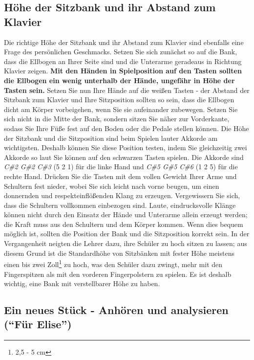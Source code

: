 \subsection{Höhe der Sitzbank und ihr Abstand zum Klavier}
\label{c1ii3}

Die richtige Höhe der Sitzbank und ihr Abstand zum Klavier sind ebenfalls eine Frage des persönlichen Geschmacks.
Setzen Sie sich zunächst so auf die Bank, dass die Ellbogen an Ihrer Seite sind und die Unterarme geradeaus in Richtung Klavier zeigen.
\textbf{Mit den Händen in Spielposition auf den Tasten sollten die Ellbogen ein wenig unterhalb der Hände, ungefähr in Höhe der Tasten sein.}
Setzen Sie nun Ihre Hände auf die weißen Tasten - der Abstand der Sitzbank zum Klavier und Ihre Sitzposition sollten so sein, dass die Ellbogen dicht am Körper vorbeigehen, wenn Sie sie aufeinander zubewegen.
Setzen Sie sich nicht in die Mitte der Bank, sondern sitzen Sie näher zur Vorderkante, sodass Sie Ihre Füße fest auf den Boden oder die Pedale stellen können.
Die Höhe der Sitzbank und die Sitzposition sind beim Spielen lauter Akkorde am wichtigsten.
Deshalb können Sie diese Position testen, indem Sie gleichzeitig zwei Akkorde so laut Sie können auf den schwarzen Tasten spielen.
Die Akkorde sind \textit{C\#2 G\#2 C\#3} (5 2 1) für die linke Hand und \textit{C\#5 G\#5 C\#6} (1 2 5) für die rechte Hand.
Drücken Sie die Tasten mit dem vollen Gewicht Ihrer Arme und Schultern fest nieder, wobei Sie sich leicht nach vorne beugen, um einen donnernden und respekteinflößenden Klang zu erzeugen.
Vergewissern Sie sich, dass die Schultern vollkommen einbezogen sind.
Laute, eindrucksvolle Klänge können nicht durch den Einsatz der Hände und Unterarme allein erzeugt werden; die Kraft muss aus den Schultern und dem Körper kommen.
Wenn dies bequem möglich ist, sollten die Position der Bank und die Sitzposition korrekt sein.
In der Vergangenheit neigten die Lehrer dazu, ihre Schüler zu hoch sitzen zu lassen;
aus diesem Grund ist die Standardhöhe von Sitzbänken mit fester Höhe meistens einen bis zwei Zoll\footnote{2,5 - 5 cm} zu hoch, was den Schüler dazu zwingt, mehr mit den Fingerspitzen als mit den vorderen Fingerpolstern zu spielen.
Es ist deshalb wichtig, eine Bank mit verstellbarer Höhe zu haben.


\subsection{Ein neues Stück - Anhören und analysieren (\enquote{Für Elise})}
\label{c1ii4}

